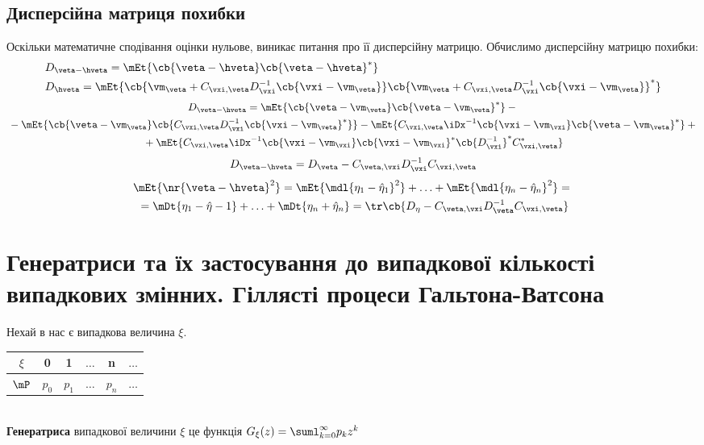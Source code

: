 \subsection{Дисперсійна матриця похибки}
Оскільки математичне сподівання оцінки нульове, виникає питання про її дисперсійну матрицю. Обчислимо дисперсійну матрицю похибки:
\begin{eqnarray}
&D_{\veta-\hveta} = \mEt{\cb{\veta-\hveta}\cb{\veta-\hveta}^\ast}\\
&D_{\hveta} = \mEt{\cb{ \vm_{\veta} + C_{\vxi,\veta}D^{-1}_{\vxi}\cb{\vxi-\vm_{\veta}}}\cb{ \vm_{\veta} + C_{\vxi,\veta}D^{-1}_{\vxi}\cb{\vxi-\vm_{\veta}}}^\ast}
\end{eqnarray}
\begin{multline}
D_{\veta-\hveta} = \mEt{\cb{\veta-\vm_{\veta}}\cb{\veta-\vm_{\veta}}^\ast} -{}\\{}- \mEt{\cb{\veta-\vm_{\veta}}\cb{C_{\vxi,\veta}D^{-1}_{\vxi}\cb{\vxi-\vm_{\veta}}^\ast}} - \mEt{C_{\vxi,\veta}\iDx^{-1}\cb{\vxi-\vm_{\vxi}}\cb{\veta-\vm_{\veta}}^\ast} +{}\\{}+ \mEt{C_{\vxi,\veta}\iDx^{-1}\cb{\vxi-\vm_{\vxi}}\cb{\vxi-\vm_{\vxi}}^\ast\cb{D^{-1}_{\vxi}}^\ast C^\ast_{\vxi,\veta}}
\end{multline}
\begin{equation}
D_{\veta-\hveta} = D_{\veta} - C_{\veta,\vxi}D^{-1}_{\vxi} C_{\vxi,\veta}
\end{equation}
\begin{multline}
\mEt{\nr{\veta-\hveta}^2} = \mEt{\mdl{\eta_1-\hat{\eta}_1}^2}+\ldots+\mEt{\mdl{\eta_n-\hat{\eta}_n}^2} ={}\\{}=\mDt{\eta_1-\hat{\eta}-1} + \ldots + \mDt{\eta_n + \hat{\eta}_n} = \tr\cb{D_{\eta}-C_{\veta,\vxi}D^{-1}_{\veta}C_{\vxi,\veta}}
\end{multline}
\section{Генератриси та їх застосування до випадкової кількості випадкових змінних. Гіллясті процеси Гальтона-Ватсона}
Нехай в нас є випадкова величина $\xi$.\\
\begin{tabular}{c|c|c|c|c|c}
$\xi$ & 0 & 1 & $\ldots$ & n & $\ldots$\\
\hline
$\mP$ & $p_0$ & $p_1$ & $\ldots$ & $p_n$ & $\ldots$
\end{tabular}\\
\textbf{Генератриса} випадкової величини $\xi$ це функція $G_\xi(z) = \suml_{k=0}^\infty p_k z^k$
